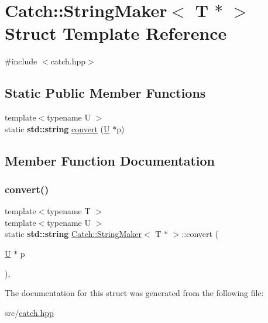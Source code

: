 \hypertarget{struct_catch_1_1_string_maker_3_01_t_01_5_01_4}{}\section{Catch\+:\+:String\+Maker$<$ T $\ast$ $>$ Struct Template Reference}
\label{struct_catch_1_1_string_maker_3_01_t_01_5_01_4}


{\ttfamily \#include $<$catch.\+hpp$>$}

\subsection*{Static Public Member Functions}
\begin{DoxyCompactItemize}
\item 
{\footnotesize template$<$typename U $>$ }\\static \textbf{ std\+::string} \hyperlink{struct_catch_1_1_string_maker_3_01_t_01_5_01_4_a2adbc75c99d71b8323f4052bcb0815c9}{convert} (\hyperlink{union_u}{U} $\ast$p)
\end{DoxyCompactItemize}


\subsection{Member Function Documentation}
\mbox{\label{struct_catch_1_1_string_maker_3_01_t_01_5_01_4_a2adbc75c99d71b8323f4052bcb0815c9}} 
\subsubsection{\texorpdfstring{convert()}{convert()}}
{\footnotesize\ttfamily template$<$typename T $>$ \\
template$<$typename U $>$ \\
static \textbf{ std\+::string} \hyperlink{struct_catch_1_1_string_maker}{Catch\+::\+String\+Maker}$<$ T $\ast$ $>$\+::convert (\begin{DoxyParamCaption}\item[{\hyperlink{union_u}{U} $\ast$}]{p }\end{DoxyParamCaption})\hspace{0.3cm}{\ttfamily [inline]}, {\ttfamily [static]}}



The documentation for this struct was generated from the following file\+:\begin{DoxyCompactItemize}
\item 
src/\hyperlink{catch_8hpp}{catch.\+hpp}\end{DoxyCompactItemize}
